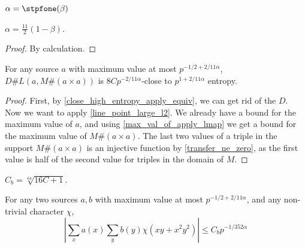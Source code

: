 \begin{definition}
    \label{bourgainα}
    \leanok
    $\alpha = \stpfone(\beta)$
\end{definition}

\begin{lemma}
    \label{bα_val}
    \leanok
    $\alpha = \frac{11}2(1 - \beta)$.
\end{lemma}

\begin{proof}
    \leanok
    By calculation.
\end{proof}

\begin{lemma}
    \label{bourgain_extractor_aux₃}
    \leanok
    For any source $a$ with maximum value at most $p^{-1/2 + 2/11 \alpha}$,
    $D \# L(a, M \# (a \times a))$ is $8 C p^{-2/11 \alpha}$-close to $p^{1+2/11 \alpha}$ entropy.
\end{lemma}

\begin{proof}
    \leanok
    First, by \ref{close_high_entropy_apply_equiv}, we can get rid of the $D$.
    Now we want to apply \ref{line_point_large_l2}.
    We already have a bound for the maximum value of $a$, and using \ref{max_val_of_apply_lmap} we get a bound
    for the maximum value of $M \# (a \times a)$.
    The last two values of a triple in the support $M \# (a \times a)$ is an injective function
    by \ref{transfer_ne_zero}, as the first value is half of the second value for triples in the domain of $M$.
\end{proof}

\begin{definition}
    \label{bourgain_C}
    \leanok
    $C_b = \sqrt[64]{16C + 1}$.
\end{definition}

\begin{theorem}
    \label{bourgain_extractor}
    \leanok
    For any two sources $a, b$ with maximum value at most $p^{-1/2 + 2/11 \alpha}$,
    and any non-trivial character $\chi$,
    $$ |\sum_x a(x) \sum_y b(y) \chi(xy + x^2y^2)| \leq C_b p^{-1/352 \alpha}$$
\end{theorem}

